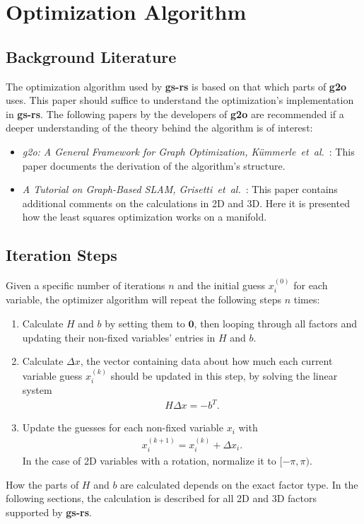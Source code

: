 \section{Optimization Algorithm}

\subsection{Background Literature}

The optimization algorithm used by \textbf{gs-rs} is based on that which parts of \textbf{g2o} uses. This paper should suffice to understand the optimization's implementation in \textbf{gs-rs}. The following papers by the developers of \textbf{g2o} are recommended if a deeper understanding of the theory behind the algorithm is of interest:
\begin{itemize}
	\item \textit{g2o: A General Framework for Graph Optimization, Kümmerle~et~al.}~\cite{kummerle2011g2o}: This paper documents the derivation of the algorithm's structure.
	\item \textit{A Tutorial on Graph-Based SLAM, Grisetti~et~al.}~\cite{grisetti2010tutorial}: This paper contains additional comments on the calculations in 2D and 3D. Here it is presented how the least squares optimization works on a manifold.
\end{itemize}

\subsection{Iteration Steps}

Given a specific number of iterations $n$ and the initial guess $x_i^{(0)}$ for each variable, the optimizer algorithm will repeat the following steps $n$ times:
\begin{enumerate}
	\item Calculate $H$ and $b$ by setting them to $\boldsymbol{0}$, then looping through all factors and updating their non-fixed variables' entries in $H$ and $b$.
	\item Calculate $\Delta x$, the vector containing data about how much each current variable guess $x_i^{(k)}$ should be updated in this step, by solving the linear system
		\begin{align}
			H \Delta x = -b^T.
		\end{align}
	\item Update the guesses for each non-fixed variable $x_i$ with
		\begin{align}
			x_i^{(k+1)} = x_i^{(k)} + \Delta x_i. %
		\end{align}
		In the case of 2D variables with a rotation, normalize it to $[-\pi, \pi)$.
\end{enumerate}
How the parts of $H$ and $b$ are calculated depends on the exact factor type. In the following sections, the calculation is described for all 2D and 3D factors supported by \textbf{gs-rs}.